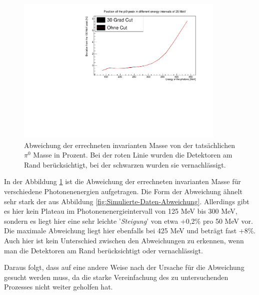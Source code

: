 \documentclass[a4paper,11pt,oneside,final,german,openbib,pdftex]{scrbook}
\begin{document}
{\begin{figure}[h!]
	\begin{center}
		\includegraphics[width=100mm]{NewCalib/UrsprungIsotrop/20171904SimIsotropUrsprungBothDeviation}
	\end{center}
\caption[Simulation: Symmetrische Photonen; Isotroper Zerfall Abweichung mit und ohne Detektoren am Rand]{Abweichung der errechneten invarianten Masse von der tatsächlichen $\pi^0$ Masse in Prozent. Bei der roten Linie wurden die Detektoren am Rand berücksichtigt, bei der schwarzen wurden sie vernachlässigt.}
\label{fig:Pi0-Ursprung-Relative-Abweichung}
\end{figure}



In der Abbildung \ref{fig:Pi0-Ursprung-Relative-Abweichung} ist die Abweichung der errechneten invarianten Masse für verschiedene Photonenenergien aufgetragen. Die Form der Abweichung ähnelt sehr stark der aus Abbildung \ref{fig:Simulierte-Daten-Abweichung}.
 Allerdings gibt es hier kein Plateau im Photonenenergieintervall von 125 MeV bis 300 MeV, sondern es liegt hier eine sehr leichte '\textit{Steigung}' von etwa +0,2\% pro 50 MeV vor. Die maximale Abweichung liegt hier ebenfalls bei 425 MeV und betr\"agt fast +8\%. Auch hier ist kein Unterschied zwischen den Abweichungen zu erkennen, wenn man die Detektoren am Rand berücksichtigt oder vernachlässigt. 

Daraus folgt, dass auf eine andere Weise nach der Ursache für die Abweichung gesucht werden muss, da die starke Vereinfachung des zu untersuchenden Prozesses nicht weiter geholfen hat.


}
\end{document}
